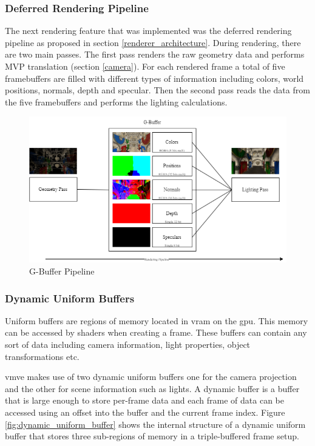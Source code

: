 \documentclass[11pt]{article}
\begin{document}
\subsubsection{Deferred Rendering Pipeline}
The next rendering feature that was implemented was the deferred rendering
pipeline as proposed in section \ref{renderer_architecture}. During rendering,
there are two main passes. The first pass renders the raw geometry data and
performs MVP translation (section \ref{camera}). For each rendered frame a total
of five framebuffers are filled with different types of information including
colors, world positions, normals, depth and specular. Then the second pass reads
the data from the five framebuffers and performs the lighting calculations. 

\begin{figure}[H]
  \centering
  \includegraphics[width=\textwidth]{images/g_buffer.png}
  \caption{G-Buffer Pipeline}
  \label{fig:g_buffer}
\end{figure}



\subsubsection{Dynamic Uniform Buffers}
Uniform buffers are regions of memory located in \gls*{vram} on the \gls*{gpu}.
This memory can be accessed by shaders when creating a frame. These buffers can
contain any sort of data including camera information, light properties, object
transformations etc.

\gls*{vmve} makes use of two dynamic uniform buffers one for the camera
projection and the other for scene information such as lights. A dynamic buffer
is a buffer that is large enough to store per-frame data and each frame of data
can be accessed using an offset into the buffer and the current frame index.
Figure \ref{fig:dynamic_uniform_buffer} shows the internal structure of a dynamic
uniform buffer that stores three sub-regions of memory in a triple-buffered
frame setup.
\end{document}
